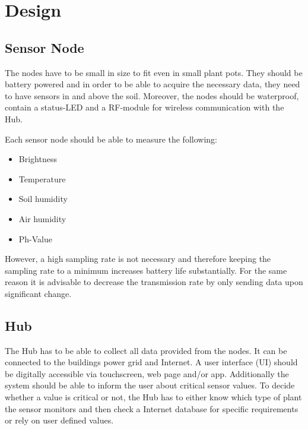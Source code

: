 \documentclass[conference]{IEEEtran}
\begin{document}
\section{Design}
\subsection{Sensor Node}
The nodes have to be small in size to fit even in small plant pots. They should be battery powered and in order to be able to acquire the necessary data, they need to have sensors in and above the soil. Moreover, the nodes should be waterproof, contain a status-LED and a RF-module for wireless communication with the Hub.

Each sensor node should be able to measure the following:
\begin{itemize}
	\item Brightness
	\item Temperature
	\item Soil humidity
	\item Air humidity
	\item Ph-Value
\end{itemize}
However, a high sampling rate is not necessary and therefore keeping the sampling rate to a minimum increases battery life substantially. For the same reason it is advisable to decrease the transmission rate by only sending data upon significant change.

\subsection{Hub}
The Hub has to be able to collect all data provided from the nodes. It can be connected to the buildings power grid and Internet. A user interface (UI) should be digitally accessible via touchscreen, web page and/or app. Additionally the system should be able to inform the user about critical sensor values. To decide whether a value is critical or not, the Hub has to either know which type of plant the sensor monitors and then check a Internet database for specific requirements or rely on user defined values.


\end{document}

